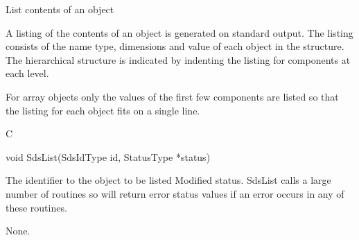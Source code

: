 \begin{manroutinedescription}
\begin{mantwocolumntable}
\end{mantwocolumntable}
 
 
 
\end{manroutinedescription}
\begin{manroutinedescription}
      List contents of an {} object

      A listing of the contents of an {} object is generated on
      standard output. The listing consists of the name type, dimensions
      and value of each object in the structure. The hierarchical structure
      is indicated by indenting the listing for components at each level.
 
      For array objects only the values of the first few components are
      listed so that the listing for each object fits on a single line.
 
      C

      void SdsList(SdsIdType id, StatusType *status)
 
\begin{manparametertable}
  The identifier to the object %
to be listed
 Modified status. SdsList calls %
a large number
                             of {} routines so will return error %
status
                             values if an error occurs in any of these
                             routines.
 


\end{manparametertable}
      None.

\end{manroutinedescription}
